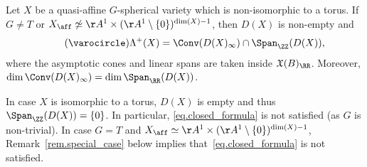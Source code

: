 \begin{theorem}
\label{thm.description_of_weight-monoid}
Let $X$ be a quasi-affine $G$-spherical variety which is non-isomorphic to a torus.
If $G \neq T$ or $X_{\aff} \not\simeq \AA^1 \times (\AA^1 \setminus \{0\})^{\dim(X)-1}$, then
$D(X)$ is non-empty and
\[
\label{eq.closed_formula}
\tag{$\varocircle$}
\Lambda^+(X) = \Conv ( D(X)_{\infty}) \cap \Span_{\ZZ}(D(X)),
\]
where the asymptotic cones and linear spans are taken inside $\mathfrak{X}(B)_{\RR}$.
Moreover, $\dim \Conv ( D(X)_{\infty}) = \dim \Span_{\RR}(D(X))$.
\end{theorem}

In case $X$ is isomorphic to a torus, $D(X)$ is empty and thus $\Span_{\ZZ}(D(X)) = \{0\}$.
In particular, \eqref{eq.closed_formula} is not satisfied (as $G$ is non-trivial).
In case $G = T$ and $X_{\aff} \simeq \AA^1 \times (\AA^1 \setminus \{0\})^{\dim(X)-1}$, Remark~\ref{rem.special_case} below implies that~\eqref{eq.closed_formula} is not satisfied.


